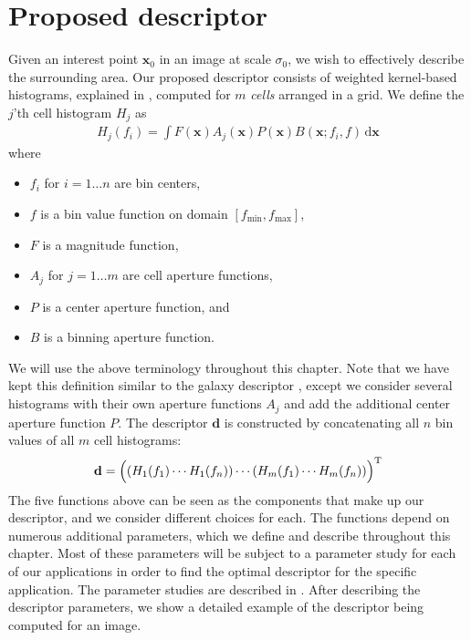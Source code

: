 \documentclass[thesis.tex]{subfiles}
\def\x{\mathbf{x}}
\def\d{\mathbf{d}}
\begin{document}
\chapter{Proposed descriptor}
%
Given an interest point $\x_0$ in an image at scale $\sigma_0$, we wish to effectively describe the surrounding area. Our proposed descriptor consists of weighted kernel-based histograms, explained in , computed for $m$ \textit{cells} arranged in a grid. We define the $j$'th cell histogram $H_j$ as
%
\begin{align}
\label{eq:proposed_histogram}
H_j(f_i) = \int F(\x) A_j (\x) P (\x) B(\x; f_i,f) \,\text{d} \x
\end{align}
%
where
%
\begin{itemize}
\item[] $f_i$ for $i = 1 \dots n$ are bin centers,
\item[] $f$ is a bin value function on domain $[f_\text{min},f_\text{max}]$,
\item[] $F$ is a magnitude function,
\item[] $A_j$ for $j = 1 \dots m$ are cell aperture functions,
\item[] $P$ is a center aperture function, and
\item[] $B$ is a binning aperture function.
\end{itemize}
%
We will use the above terminology throughout this chapter. Note that we have kept this definition similar to the galaxy descriptor \cite{pedersen2013shape}, except we consider several histograms with their own aperture functions $A_j$ and add the additional center aperture function $P$. The descriptor $\d$ is constructed by concatenating all $n$ bin values of all $m$ cell histograms:
%
\begin{align}
\label{eq:proposed_descriptor}
\d = \Bigl( \left(H_1(f_1) \cdots H_1(f_n)\right) \cdots (H_m(f_1) \cdots H_m(f_n)) \Bigr) ^\text{T}
\end{align}
%
The five functions above can be seen as the components that make up our descriptor, and we consider different choices for each. The functions depend on numerous additional parameters, which we define and describe throughout this chapter. Most of these parameters will be subject to a parameter study for each of our applications in order to find the optimal descriptor for the specific application. The parameter studies are described in . After describing the descriptor parameters, we show a detailed example of the descriptor being computed for an image.
%
\end{document}

